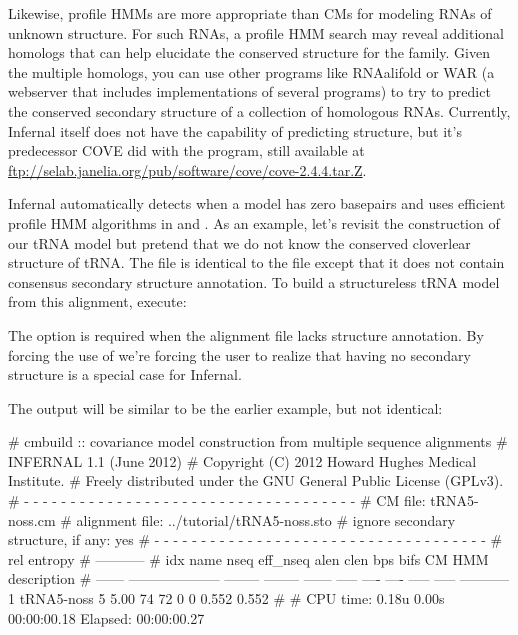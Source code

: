 Likewise, profile HMMs are more appropriate than CMs for modeling RNAs
of unknown structure. For such RNAs, a profile HMM search may reveal
additional homologs that can help elucidate the conserved structure
for the family. Given the multiple homologs, you can use other
programs like RNAalifold \cite{Bernhart08,Hofacker02} or WAR
\cite{Torarinsson08} (a webserver that includes implementations of
several programs) to try to predict the conserved secondary structure
of a collection of homologous RNAs. Currently, Infernal itself does
not have the capability of predicting structure, but it's predecessor
COVE did with the  program, still available at
\url{ftp://selab.janelia.org/pub/software/cove/cove-2.4.4.tar.Z}.

Infernal automatically detects when a model has zero basepairs and
uses efficient profile HMM algorithms in  and
. As an example, let's revisit the construction of our
tRNA model but pretend that we do not know the conserved cloverlear
structure of tRNA.
The file 
 is identical to the file 
 except that it does not contain consensus
secondary structure annotation. 
To build a structureless tRNA model from this alignment, execute:


The  option is required when the alignment file lacks
structure annotation. By forcing the use of  we're
forcing the user to realize that having no secondary structure is a
special case for Infernal.

The output will be similar to be the earlier example, but not
identical:

\begin{sreoutput}
# cmbuild :: covariance model construction from multiple sequence alignments
# INFERNAL 1.1 (June 2012)
# Copyright (C) 2012 Howard Hughes Medical Institute.
# Freely distributed under the GNU General Public License (GPLv3).
# - - - - - - - - - - - - - - - - - - - - - - - - - - - - - - - - - - - -
# CM file:                                            tRNA5-noss.cm
# alignment file:                                     ../tutorial/tRNA5-noss.sto
# ignore secondary structure, if any:                 yes
# - - - - - - - - - - - - - - - - - - - - - - - - - - - - - - - - - - - -
#                                                                      rel entropy
#                                                                      -----------
# idx    name                     nseq eff_nseq   alen  clen  bps bifs    CM   HMM description
# ------ -------------------- -------- -------- ------ ----- ---- ---- ----- ----- -----------
       1 tRNA5-noss                  5     5.00     74    72    0    0 0.552 0.552 
#
# CPU time: 0.18u 0.00s 00:00:00.18 Elapsed: 00:00:00.27
\end{sreoutput}

